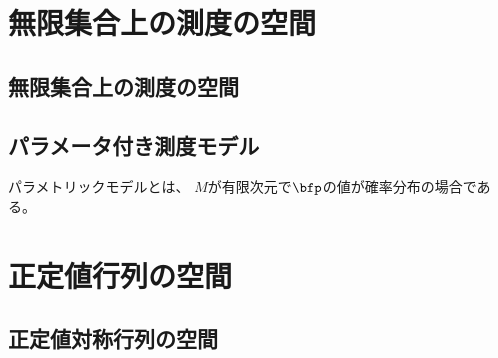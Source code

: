 \documentclass[report]{jlreq}
\begin{document}
%
\chapter{無限集合上の測度の空間}

%
\section{無限集合上の測度の空間}

\TODO{}

%
\section{パラメータ付き測度モデル}

\begin{definition}[パラメータ付き測度モデル]
    \TODO{}
\end{definition}

パラメトリックモデルとは、
$M$が有限次元で$\bfp$の値が確率分布の場合である。

\begin{definition}[パラメトリックモデル]
    \TODO{}
\end{definition}



%
\chapter{正定値行列の空間}



%
\section{正定値対称行列の空間}

\begin{definition}[正定値対称行列の空間]
    \TODO{}
\end{definition}
\end{document}
